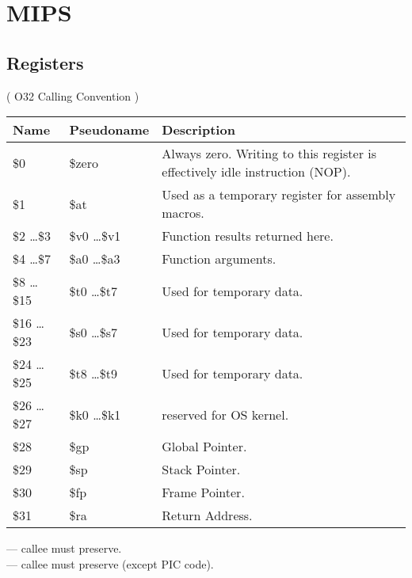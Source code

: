 \ifx\RUSSIAN\undefined
\chapter{MIPS}

\section{Registers}
\label{MIPS_registers_ref}

( O32 Calling Convention )

\begin{center}
\begin{tabular}{ | l | l | l | }
\hline
\cellcolor{blue!25} Name & \cellcolor{blue!25} Pseudoname & \cellcolor{blue!25} Description \\
\hline
\$0             & \$zero          & Always zero. Writing to this register is effectively idle instruction (\ac{NOP}). \\
\hline
\$1             & \$at            & Used as a temporary register for assembly macros. \\
\hline
\$2 \dots \$3   & \$v0 \dots \$v1 & Function results returned here. \\
\hline
\$4 \dots \$7   & \$a0 \dots \$a3 & Function arguments. \\
\hline
\$8 \dots \$15  & \$t0 \dots \$t7 & Used for temporary data. \\
\hline
\$16 \dots \$23 & \$s0 \dots \$s7 & Used for temporary data\AsteriskOne{}. \\
\hline
\$24 \dots \$25 & \$t8 \dots \$t9 & Used for temporary data. \\
\hline
\$26 \dots \$27 & \$k0 \dots \$k1 & reserved for OS kernel. \\
\hline
\$28            & \$gp            & Global Pointer\AsteriskTwo{}. \\
\hline
\$29            & \$sp            & Stack Pointer\AsteriskOne{}. \\
\hline
\$30            & \$fp            & Frame Pointer\AsteriskOne{}. \\
\hline
\$31            & \$ra            & Return Address. \\
\hline
\end{tabular}
\end{center}

\AsteriskOne{} --- \Gls{callee} must preserve.\\
\AsteriskTwo{} --- \Gls{callee} must preserve (except \ac{PIC} code).\\

\iffalse
PC
HI/LO - holds results of mult/multu/div/divu

FPU:
$f0..$f30
\fi

\fi
